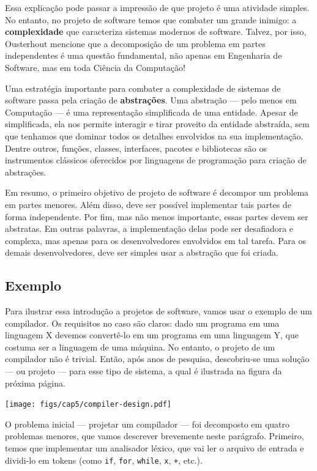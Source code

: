 \documentclass[
  11pt,
  twoside]{book}
\newcommand{\passthrough}[1]{#1}
\let\origfigure\figure
\let\endorigfigure\endfigure
\renewenvironment{figure}[1][2] {
    \expandafter\origfigure\expandafter[!h]
} {
    \endorigfigure
}
\begin{document}
Essa explicação pode passar a impressão de que projeto é uma atividade
simples. No entanto, no projeto de software temos que combater um grande
inimigo: a \textbf{complexidade} que caracteriza sistemas modernos de
software. Talvez, por isso, Ousterhout mencione que a decomposição de um
problema em partes independentes é uma questão fundamental, não apenas
em Engenharia de Software, mas em toda Ciência da Computação!

 Uma estratégia importante para combater a complexidade
de sistemas de software passa pela criação de \textbf{abstrações}. Uma
abstração --- pelo menos em Computação --- é uma representação
simplificada de uma entidade. Apesar de simplificada, ela nos permite
interagir e tirar proveito da entidade abstraída, sem que tenhamos que
dominar todos os detalhes envolvidos na sua implementação. Dentre
outros, funções, classes, interfaces, pacotes e bibliotecas são os
instrumentos clássicos oferecidos por linguagens de programação para
criação de abstrações.

Em resumo, o primeiro objetivo de projeto de software é decompor um
problema em partes menores. Além disso, deve ser possível implementar
tais partes de forma independente. Por fim, mas não menos importante,
essas partes devem ser abstratas. Em outras palavras, a implementação
delas pode ser desafiadora e complexa, mas apenas para os
desenvolvedores envolvidos em tal tarefa. Para os demais
desenvolvedores, deve ser simples usar a abstração que foi criada.

\hypertarget{exemplo}{%
\subsection{Exemplo}\label{exemplo}}

Para ilustrar essa introdução a projetos de software, vamos usar o
exemplo de um compilador. Os requisitos no caso são claros: dado um
programa em uma linguagem X devemos convertê-lo em um programa em uma
linguagem Y, que costuma ser a linguagem de uma máquina. No entanto, o
projeto de um compilador não é trivial. Então, após anos de pesquisa,
descobriu-se uma solução --- ou projeto --- para esse tipo de sistema, a
qual é ilustrada na figura da próxima página.

\begin{figure}
\centering
\texttt{[image: figs/cap5/compiler-design.pdf]}
\caption{Principais módulos de um compilador}
\end{figure}

O problema inicial --- projetar um compilador --- foi decomposto em
quatro problemas menores, que vamos descrever brevemente neste
parágrafo. Primeiro, temos que implementar um analisador léxico, que vai
ler o arquivo de entrada e dividi-lo em tokens (como
\passthrough{\lstinline!if!}, \passthrough{\lstinline!for!},
\passthrough{\lstinline!while!}, \passthrough{\lstinline!x!},
\passthrough{\lstinline!+!}, etc.).
\end{document}
